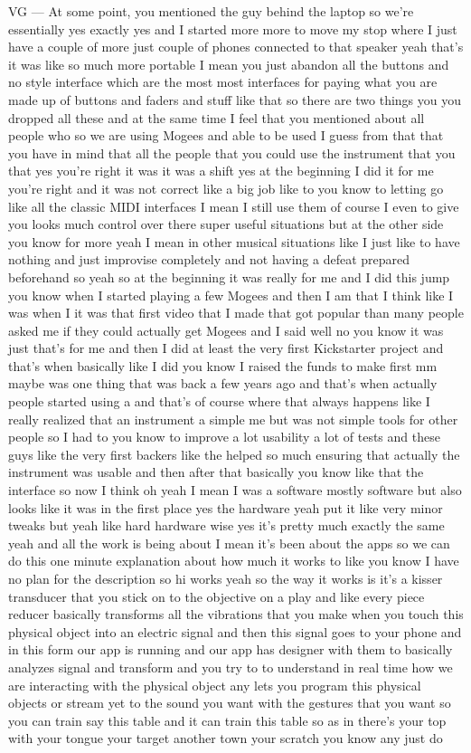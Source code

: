 VG — At some point, you mentioned the guy behind the laptop so we're essentially yes exactly yes and I started more more to move my stop where I just have a couple of more just couple of phones connected to that speaker yeah that's it was like so much more portable I mean you just abandon all the buttons and no style interface which are the most most interfaces for paying what you are made up of buttons and faders and stuff like that so there are two things you you dropped all these and at the same time I feel that you mentioned about all people who so we are using Mogees and able to be used I guess from that that you have in mind that all the people that you could use the instrument that you that yes you're right it was it was a shift yes at the beginning I did it for me you're right and it was not correct like a big job like to you know to letting go like all the classic MIDI interfaces I mean I still use them of course I even to give you looks much control over there super useful situations but at the other side you know for more yeah I mean in other musical situations like I just like to have nothing and just improvise completely and not having a defeat prepared beforehand so yeah so at the beginning it was really for me and I did this jump you know when I started playing a few Mogees and then I am that I think like I was when I it was that first video that I made that got popular than many people asked me if they could actually get Mogees and I said well no you know it was just that's for me and then I did at least the very first Kickstarter project and that's when basically like I did you know I raised the funds to make first mm maybe was one thing that was back a few years ago and that's when actually people started using a and that's of course where that always happens like I really realized that an instrument a simple me but was not simple tools for other people so I had to you know to improve a lot usability a lot of tests and these guys like the very first backers like the helped so much ensuring that actually the instrument was usable and then after that basically you know like that the interface so now I think oh yeah I mean I was a software mostly software but also looks like it was in the first place yes the hardware yeah put it like very minor tweaks but yeah like hard hardware wise yes it's pretty much exactly the same yeah and all the work is being about I mean it's been about the apps so we can do this one minute explanation about how much it works to like you know I have no plan for the description so hi works yeah so the way it works is it's a kisser transducer that you stick on to the objective on a play and like every piece reducer basically transforms all the vibrations that you make when you touch this physical object into an electric signal and then this signal goes to your phone and in this form our app is running and our app has designer with them to basically analyzes signal and transform and you try to to understand in real time how we are interacting with the physical object any lets you program this physical objects or stream yet to the sound you want with the gestures that you want so you can train say this table and it can train this table so as in there's your top with your tongue your target another town your scratch you know any just do 